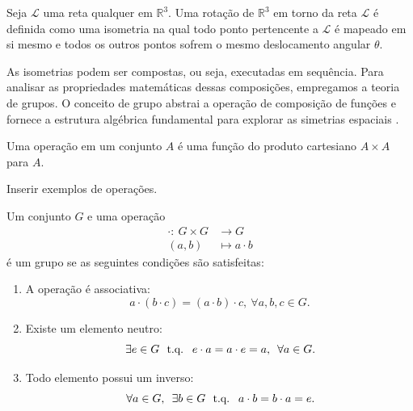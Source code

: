 % 

\begin{definicao}[Rotação]
    \label{def:rotacao}
    Seja \(\mathcal{L}\) uma reta qualquer em \(\mathbb{R}^3\). Uma rotação de \(\mathbb{R}^3\) em torno da reta \(\mathcal{L}\) é definida como uma isometria na qual todo ponto pertencente a \(\mathcal{L}\) é mapeado em si mesmo e todos os outros pontos sofrem o mesmo deslocamento angular \(\theta\).
\end{definicao}

% 

As isometrias podem ser compostas, ou seja, executadas em sequência. Para analisar as propriedades matemáticas dessas composições, empregamos a teoria de grupos. O conceito de grupo abstrai a operação de composição de funções e fornece a estrutura algébrica fundamental para explorar as simetrias espaciais \parencite{garcia2014}.

\begin{definicao}[Operação]
    \label{def:operacao}
    Uma operação em um conjunto \(A\) é uma função do produto cartesiano \(A \times A\) para \(A\).
\end{definicao}


\begin{exemplo}
    \label{ex:operacoes}
    Inserir exemplos de operações.
\end{exemplo}

\begin{definicao}[Grupo]
    \label{def:g_equidecomponibilidade}
    \label{def:grupo}
    Um conjunto \(G\) e uma operação
    \begin{align*}
        \cdot : \ G \times G & \to G             \\
        (a,b)                & \mapsto a \cdot b
    \end{align*}
    é um grupo se as seguintes condições são satisfeitas:
    \begin{enumerate}
        \item A operação é associativa:
              \[
                  a \cdot (b \cdot c) = (a \cdot b) \cdot c, \ \forall a,b,c \in G.
              \]
        \item Existe um elemento neutro:
              \[
                  \exists e \in G \tq e \cdot a = a \cdot e = a, \ \forall a \in G.
              \]
        \item Todo elemento possui um inverso:
              \[
                  \forall a \in G, \ \exists b \in G \tq a \cdot b = b \cdot a = e.
              \]
    \end{enumerate}
\end{definicao}

